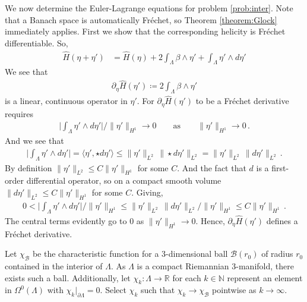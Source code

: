\documentclass[11pt]{article}
\theoremstyle{plain}
\theoremstyle{definition}
\theoremstyle{remark}
\newcommand{\R}{\mathbb{R}}
\newcommand{\B}{\mathcal{B}}
\newcommand{\ST}{\Lambda}
\begin{document}
We now determine the Euler-Lagrange equations for problem \eqref{prob:inter}. Note that a Banach space is automatically Fréchet, so Theorem \ref{theorem:Glock} immediately applies. First we show that the corresponding helicity is Fr\'echet differentiable. So,
\begin{align*}
    \hat H ( \eta + \eta') 
    &= \hat H ( \eta ) +
    2 \int_{\ST} \beta \wedge  \eta'  
    +
    \int_{\ST}  \eta'  \wedge d \eta' 
\end{align*}
We see that 
\begin{align*}
    \partial_{\eta} \hat H(  \eta'  ) \coloneqq 2 \int_{\ST} \beta \wedge  \eta'  
\end{align*}
is a linear, continuous operator in \(\eta'\). For \(\partial_{\eta} \hat H(  \eta'  )\) to be a Fr\'echet derivative requires
\begin{align*}
    \Big| \int_{\ST}  \eta'  \wedge d \eta' \Big|  / \| \eta' \|_{H^1} \to 0 \qquad \text{as} \qquad  \| \eta' \|_{H^1} \to 0 \, . 
\end{align*}
And we see that
\begin{align*}
    \Big| \int_{\ST}  \eta'  \wedge d \eta' \Big| = \langle \eta'  , \star d \eta' \rangle
    \leq
    \| \eta' \|_{L^2} \, \| \star d \eta'  \|_{L^2}
    =
    \| \eta' \|_{L^2} \, \|  d \eta'  \|_{L^2} \, .
\end{align*}
By definition \( \| \eta' \|_{L^2} \leq C \| \eta' \|_{H^1}\) for some \(C\). And the fact that \(d\) is a first-order differential operator, so on a compact smooth volume \( \| d \eta' \|_{L^2} \leq C \| \eta' \|_{H^1}\) for some \(C\). Giving,
\begin{align*}
    0 < \Big| \int_{\ST}  \eta'  \wedge d \eta' \Big|  / \| \eta' \|_{H^1} \leq \| \eta' \|_{L^2} \, \|  d \eta'  \|_{L^2}  / \| \eta' \|_{H^1}  \leq C \| \eta' \|_{H^1} \, .
\end{align*}
The central terms evidently go to 0 as \(\| \eta' \|_{H^1} \to 0 \). Hence, \(\partial_{\eta} \hat H(  \eta'  )\) defines a Fr\'echet derivative. 



Let \(\chi_{\B}\) be the characteristic function for a 3-dimensional ball \(\B(r_0)\) of radius \(r_0\) contained in the interior of \(\ST\). As \(\ST\) is a compact Riemannian 3-manifold, there exists such a ball. Additionally, let \(\chi_k : \ST \to \R\) for each \(k \in \mathbb{N}\) represent an element in \( \Omega^0 (\ST)\) with \(\chi_k |_{\partial \ST} = 0\). Select \(\chi_k\) such that \(\chi_k \to \chi_{\B}\) pointwise as \(k \to \infty\). 
\end{document}
